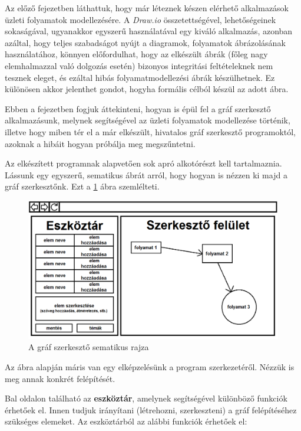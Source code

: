 

Az előző fejezetben láthattuk, hogy már léteznek készen elérhető alkalmazások üzleti folyamatok modellezésére. A \textit{Draw.io} összetettségével, lehetőségeinek sokaságával, ugyanakkor egyszerű használatával egy kiváló alkalmazás, azonban azáltal, hogy teljes szabadságot nyújt a diagramok, folyamatok ábrázolásának használatához, könnyen előfordulhat, hogy az elkészült ábrák (főleg nagy elemhalmazzal való dolgozás esetén) bizonyos integritási feltételeknek nem tesznek eleget, és ezáltal hibás folyamatmodellezési ábrák készülhetnek. Ez különösen akkor jelenthet gondot, hogyha formális célból készül az adott ábra.

Ebben a fejezetben fogjuk áttekinteni, hogyan is épül fel a gráf szerkesztő alkalmazásunk, melynek segítségével az üzleti folyamatok modellezése történik, illetve hogy miben tér el a már elkészült, hivatalos gráf szerkesztő programoktól, azoknak a hibáit hogyan próbálja meg megszűntetni.


Az elkészített programnak alapvetően sok apró alkotórészt kell tartalmaznia. Lássunk egy egyszerű, sematikus ábrát arról, hogy hogyan is nézzen ki majd a gráf szerkesztőnk. Ezt a \ref{fig:sematikus} ábra szemlélteti.

\begin{figure}[h]
\centering
\includegraphics[scale=0.5]{images/sematikus.png}
\caption{A gráf szerkesztő sematikus rajza}
\label{fig:sematikus}
\end{figure}

Az ábra alapján máris van egy elképzelésünk a program szerkezetéről. Nézzük is meg annak konkrét felépítését.

Bal oldalon található az \textbf{eszköztár}, amelynek segítségével különböző funkciók érhetőek el. Innen tudjuk irányítani (létrehozni, szerkeszteni) a gráf felépítéséhez szükséges elemeket. Az eszköztárból az alábbi funkciók érhetőek el:

